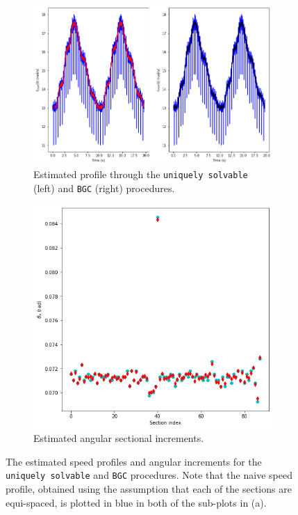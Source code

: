 \documentclass{article}
\begin{document}
	\begin{figure}[htb!]
		\centering
		\begin{subfigure}[b]{0.7\textwidth}
			\centering
			\includegraphics[width=\textwidth]{Q4_3.png}
			\caption{Estimated profile through the \texttt{uniquely solvable} (left) and \texttt{BGC} (right) procedures.}
		\end{subfigure}
		
		\begin{subfigure}[b]{0.45\textwidth}
			\centering
			\includegraphics[width=\textwidth]{Q4_4.png}
			\caption{Estimated angular sectional increments.}
		\end{subfigure}
		
		\caption{The estimated speed profiles and angular increments for the \texttt{uniquely solvable} and \texttt{BGC} procedures. Note that the naive speed profile, obtained using the assumption that each of the sections are equi-spaced, is plotted in blue in both of the sub-plots in (a).}
		\label{fig:Q4_actual_signal_comparison}
	\end{figure}
	
\end{document}
